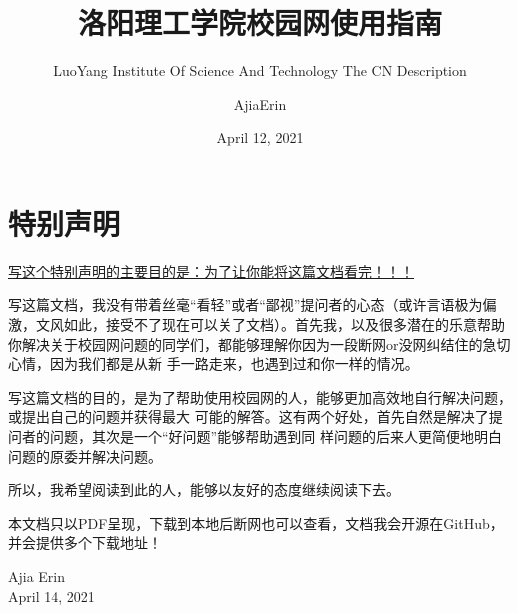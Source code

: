 \documentclass[lang=cn,11pt,chinese]{elegantbook}
\title{洛阳理工学院校园网使用指南}
\subtitle{LuoYang Institute Of Science And Technology The CN Description}
\institute{Ajia Network Technology Studio}
\date{April 12, 2021}
\author{AjiaErin}
\begin{document}
\maketitle
\frontmatter

\chapter*{特别声明}

\begin{center}
\underline{写这个特别声明的主要目的是：为了让你能将这篇文档看完！！！}
\end{center}

写这篇文档，我没有带着丝毫“看轻”或者“鄙视”提问者的心态（或许言语极为偏激，文风如此，接受不了现在可以关了文档）。首先我，以及很多潜在的乐意帮助
你解决关于校园网问题的同学们，都能够理解你因为一段断网or没网纠结住的急切心情，因为我们都是从新
手一路走来，也遇到过和你一样的情况。

写这篇文档的目的，是为了帮助使用校园网的人，能够更加高效地自行解决问题，或提出自己的问题并获得最大
可能的解答。这有两个好处，首先自然是解决了提问者的问题，其次是一个“好问题”能够帮助遇到同
样问题的后来人更简便地明白问题的原委并解决问题。

所以，我希望阅读到此的人，能够以友好的态度继续阅读下去。

本文档只以PDF呈现，下载到本地后断网也可以查看，文档我会开源在GitHub，并会提供多个下载地址！


\vskip 1.5cm

\begin{flushright}
Ajia Erin\\
April 14, 2021
\end{flushright}

\tableofcontents

\mainmatter
\end{document}
